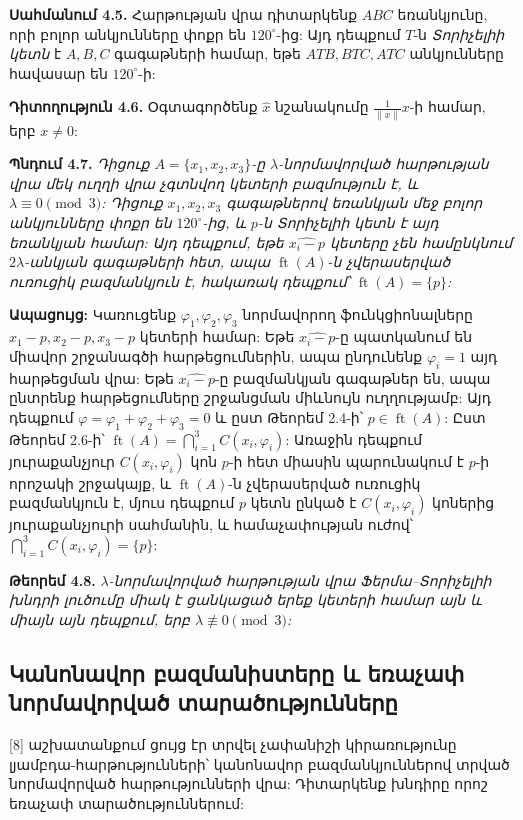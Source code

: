 \documentclass[12pt,a4paper]{article}
\numberwithin{equation}{section}
\numberwithin{figure}{section}
\begin{document}
\textbf{Սահմանում 4.5.} Հարթության վրա դիտարկենք $ABC$ եռանկյունը, որի բոլոր անկյունները փոքր են $120^\circ$-ից: Այդ դեպքում $T$-ն \textit{Տորիչելիի կետն} է $A, B, C$ գագաթների համար, եթե $ATB, BTC, ATC$ անկյունները հավասար են $120^\circ$-ի:

\textbf{Դիտողություն 4.6.} Օգտագործենք $\hat{x}$ նշանակումը $\frac{1}{\|x\|}x$-ի համար, երբ $x \ne 0$:

\textbf{Պնդում 4.7.} \textit{Դիցուք $A = \{x_1, x_2, x_3\}$-ը $\lambda$-նորմավորված հարթության վրա մեկ ուղղի վրա չգտնվող կետերի բազմություն է, և $\lambda \equiv 0 \pmod 3$: Դիցուք $x_1, x_2, x_3$ գագաթներով եռանկյան մեջ բոլոր անկյունները փոքր են $120^\circ$-ից, և $p$-ն Տորիչելիի կետն է այդ եռանկյան համար: Այդ դեպքում, եթե $\widehat{x_i - p}$ կետերը չեն համընկնում $2\lambda$-անկյան գագաթների հետ, ապա $\operatorname{ft}(A)$-ն չվերասերված ուռուցիկ բազմանկյուն է, հակառակ դեպքում՝ $\operatorname{ft}(A) = \{p\}$:}

\textbf{Ապացույց:} Կառուցենք $\varphi_1, \varphi_2, \varphi_3$ նորմավորող ֆունկցիոնալները $x_1 - p, x_2 - p, x_3 - p$ կետերի համար: Եթե $\widehat{x_i - p}$-ը պատկանում են միավոր շրջանագծի հարթեցումներին, ապա ընդունենք $\varphi_i = 1$ այդ հարթեցման վրա: Եթե $\widehat{x_i - p}$-ը բազմանկյան գագաթներ են, ապա ընտրենք հարթեցումները շրջանցման միևնույն ուղղությամբ: Այդ դեպքում $\varphi = \varphi_1 + \varphi_2 + \varphi_3 = 0$ և ըստ Թեորեմ 2.4-ի՝ $p \in \operatorname{ft}(A)$: Ըստ Թեորեմ 2.6-ի՝ $\operatorname{ft}(A) = \bigcap_{i=1}^3 C(x_i, \varphi_i)$: Առաջին դեպքում յուրաքանչյուր $C(x_i, \varphi_i)$ կոն $p$-ի հետ միասին պարունակում է $p$-ի որոշակի շրջակայք, և $\operatorname{ft}(A)$-ն չվերասերված ուռուցիկ բազմանկյուն է, մյուս դեպքում $p$ կետն ընկած է $C(x_i, \varphi_i)$ կոներից յուրաքանչյուրի սահմանին, և համաչափության ուժով՝ $\bigcap_{i=1}^3 C(x_i, \varphi_i) = \{p\}$: 

\textbf{Թեորեմ 4.8.} \textit{$\lambda$-նորմավորված հարթության վրա Ֆերմա--Տորիչելիի խնդրի լուծումը միակ է ցանկացած երեք կետերի համար այն և միայն այն դեպքում, երբ $\lambda \not\equiv 0 \pmod 3$:}

\subsection{Կանոնավոր բազմանիստերը և եռաչափ նորմավորված տարածությունները}

[8] աշխատանքում ցույց էր տրվել չափանիշի կիրառությունը լյամբդա-հարթությունների՝ կանոնավոր բազմանկյուններով տրված նորմավորված հարթությունների վրա: Դիտարկենք խնդիրը որոշ եռաչափ տարածություններում:
\end{document}
